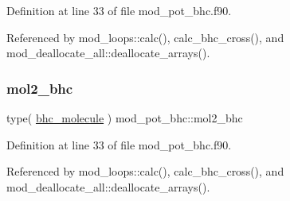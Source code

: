 Definition at line 33 of file mod\+\_\+pot\+\_\+bhc.\+f90.



Referenced by mod\+\_\+loops\+::calc(), calc\+\_\+bhc\+\_\+cross(), and mod\+\_\+deallocate\+\_\+all\+::deallocate\+\_\+arrays().

\mbox{\label{namespacemod__pot__bhc_af61e65117b770d57d6ec81037ca6590b}} 
\subsubsection{\texorpdfstring{mol2\+\_\+bhc}{mol2\_bhc}}
{\footnotesize\ttfamily type( \hyperlink{structmod__pot__bhc_1_1bhc__molecule}{bhc\+\_\+molecule} ) mod\+\_\+pot\+\_\+bhc\+::mol2\+\_\+bhc}



Definition at line 33 of file mod\+\_\+pot\+\_\+bhc.\+f90.



Referenced by mod\+\_\+loops\+::calc(), calc\+\_\+bhc\+\_\+cross(), and mod\+\_\+deallocate\+\_\+all\+::deallocate\+\_\+arrays().

